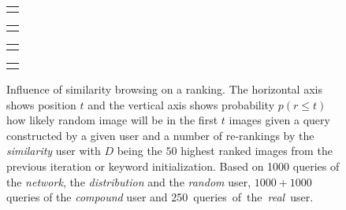 \begin{figure}[b!]
	\centering
	\begin{tabular}{@{}c@{}}
		\subfloat{
			
		}
	\end{tabular}
	\begin{tabular}{@{}c@{}}
		\subfloat{
			
		}
	\end{tabular}
	\begin{tabular}{@{}c@{}}
		\subfloat{
			
		}
	\end{tabular}
	\begin{tabular}{@{}c@{}}
		\subfloat{
			
		}
	\end{tabular}
	
	
	\caption[Influence of similarity browsing on a ranking]{Influence of similarity browsing on a ranking. The horizontal axis shows position $t$ and the vertical axis shows probability $p(r\leq t)$ how likely random image will be in the first $t$ images given a query constructed by a given user and a number of re-rankings by the \textit{similarity} user with $D$ being the $50$ highest ranked images from the previous iteration or keyword initialization. Based on 1000 queries of the \textit{network}, the \textit{distribution} and the \textit{random} user, $1000+1000$ queries of the \textit{compound} user and 250~queries~of~the~\textit{real}~user.}
	\label{fig:simulation_rerank}
\end{figure}
